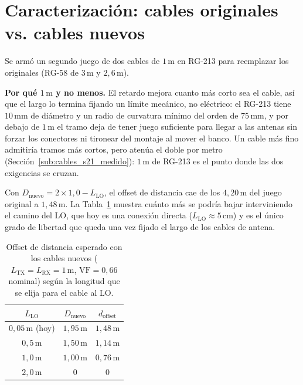 \documentclass[12pt, a4paper, twoside]{report}
\begin{document}
\section{Caracterización: cables originales vs. cables nuevos}
\label{sec:cables_plantilla}

Se armó un segundo juego de dos cables de $1\,\text{m}$ en RG-213 para
reemplazar los originales (RG-58 de $3\,\text{m}$ y $2{,}6\,\text{m}$).

\textbf{Por qué $1\,\text{m}$ y no menos.} El retardo mejora cuanto más
corto sea el cable, así que el largo lo termina fijando un límite
mecánico, no eléctrico: el RG-213 tiene $10\,\text{mm}$ de diámetro y
un radio de curvatura mínimo del orden de $75\,\text{mm}$, y por debajo
de $1\,\text{m}$ el tramo deja de tener juego suficiente para llegar a
las antenas sin forzar los conectores ni tironear del montaje al mover
el banco. Un cable más fino admitiría tramos más cortos, pero atenúa el
doble por metro (Sección~\ref{sub:cables_s21_medido}): $1\,\text{m}$ de
RG-213 es el punto donde las dos exigencias se cruzan.

Con $D_\text{nuevo} = 2\times1{,}0 - L_\text{LO}$, el offset de
distancia cae de los $4{,}20\,\text{m}$ del juego original a
$1{,}48\,\text{m}$. La Tabla~\ref{tab:cables_nuevo_offset} muestra
cuánto más se podría bajar interviniendo el camino del LO, que hoy es
una conexión directa ($L_\text{LO} \approx 5\,\text{cm}$) y es el único
grado de libertad que queda una vez fijado el largo de los cables de
antena.

\begin{table}[H]
  \centering
  \caption{Offset de distancia esperado con los cables nuevos
    ($L_\text{TX} = L_\text{RX} = 1\,\text{m}$, $\text{VF} = 0{,}66$
    nominal) según la longitud que se elija para el cable al LO.}
  \label{tab:cables_nuevo_offset}
  \begin{tabular}{ccc}
    \toprule
    $L_\text{LO}$ & $D_\text{nuevo}$ & $d_\text{offset}$ \\
    \midrule
    $0{,}05\,\text{m}$ (hoy) & $1{,}95\,\text{m}$ & $1{,}48\,\text{m}$ \\
    $0{,}5\,\text{m}$        & $1{,}50\,\text{m}$ & $1{,}14\,\text{m}$ \\
    $1{,}0\,\text{m}$        & $1{,}00\,\text{m}$ & $0{,}76\,\text{m}$ \\
    $2{,}0\,\text{m}$        & $0$                & $0$ \\
    \bottomrule
  \end{tabular}
\end{table}
\end{document}
